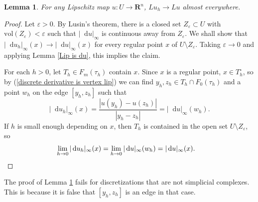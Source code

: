 \documentclass[reqno,11pt]{amsart}
\newcommand{\RR}{\mathbf{R}}
\newcommand*\dif{\mathop{}\!\mathrm{d}}
\newcommand{\vol}{\mathrm{vol}}
\newtheorem{lemma}[theorem]{Lemma}
\theoremstyle{definition}
\numberwithin{equation}{section}
\begin{document}
\begin{lemma}\label{du converges ae}
For any Lipschitz map $u: U \to \RR^n$, $Lu_h \to Lu$ almost everywhere.
\end{lemma}
\begin{proof}
Let $\varepsilon > 0$.
By Lusin's theorem, there is a closed set $Z_\varepsilon \subset U$ with $\vol(Z_\varepsilon) < \varepsilon$ such that $|\dif u|_\infty$ is continuous away from $Z_\varepsilon$.
We shall show that $|\dif u_h|_\infty(x) \to |\dif u|_\infty(x)$ for every regular point $x$ of $U \setminus Z_\varepsilon$.
Taking $\varepsilon \to 0$ and applying Lemma \ref{Lip is du}, this implies the claim.

For each $h > 0$, let $T_h \in F_m(\tau_h)$ contain $x$.
Since $x$ is a regular point, $x \in T_h^\circ$, so by (\ref{discrete derivative is vertex lip}) we can find $y_h, z_h \in T_h \cap F_0(\tau_h)$ and a point $w_h$ on the edge $[y_h, z_h]$ such that
$$|\dif u_h|_\infty(x) = \frac{|u(y_h) - u(z_h)|}{|y_h - z_h|} = |\dif u|_\infty(w_h).$$
If $h$ is small enough depending on $x$, then $T_h$ is contained in the open set $U \setminus Z_\varepsilon$, so 
\begin{align*}
\lim_{h \to 0} |\dif u_h|_\infty(x) = \lim_{h \to 0} |\dif u|_\infty(w_h) &= |\dif u|_\infty(x). \qedhere
\end{align*}
\end{proof}

The proof of Lemma \ref{du converges ae} fails for discretizations that are not simplicial complexes.
This is because it is false that $[y_h, z_h]$ is an edge in that case.

\end{document}
